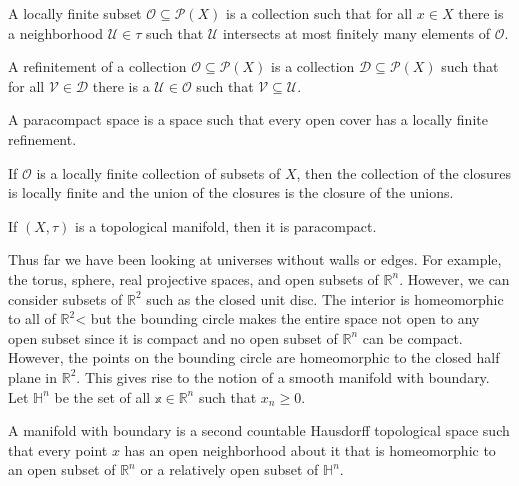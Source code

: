     \begin{definition}
        A locally finite subset $\mathcal{O}\subseteq\mathcal{P}(X)$ is a
        collection such that for all $x\in{X}$ there is a neighborhood
        $\mathcal{U}\in\tau$ such that $\mathcal{U}$ intersects at most
        finitely many elements of $\mathcal{O}$.
    \end{definition}
    \begin{definition}
        A refinitement of a collection $\mathcal{O}\subseteq\mathcal{P}(X)$
        is a collection $\mathcal{D}\subseteq\mathcal{P}(X)$ such that for
        all $\mathcal{V}\in\mathcal{D}$ there is a
        $\mathcal{U}\in\mathcal{O}$ such that
        $\mathcal{V}\subseteq\mathcal{U}$.
    \end{definition}
    \begin{definition}
        A paracompact space is a space such that every open cover has a
        locally finite refinement.
    \end{definition}
    \begin{theorem}
        If $\mathcal{O}$ is a locally finite collection of subsets of $X$,
        then the collection of the closures is locally finite and the union
        of the closures is the closure of the unions.
    \end{theorem}
    \begin{theorem}
        If $(X,\tau)$ is a topological manifold, then it is paracompact.
    \end{theorem}
    Thus far we have been looking at universes without walls or edges. For
    example, the torus, sphere, real projective spaces, and open subsets of
    $\mathbb{R}^{n}$. However, we can consider subsets of $\mathbb{R}^{2}$
    such as the closed unit disc. The interior is homeomorphic to all of
    $\mathbb{R}^{2}$< but the bounding circle makes the entire space not
    open to any open subset since it is compact and no open subset of
    $\mathbb{R}^{n}$ can be compact. However, the points on the bounding
    circle are homeomorphic to the closed half plane in $\mathbb{R}^{2}$.
    This gives rise to the notion of a smooth manifold with boundary.
    Let $\mathbb{H}^{n}$ be the set of all $\mathbb{x}\in\mathbb{R}^{n}$
    such that $x_{n}\geq{0}$.
    \begin{definition}
        A manifold with boundary is a second countable Hausdorff topological
        space such that every point $x$ has an open neighborhood about it
        that is homeomorphic to an open subset of $\mathbb{R}^{n}$ or a
        relatively open subset of $\mathbb{H}^{n}$.
    \end{definition}
